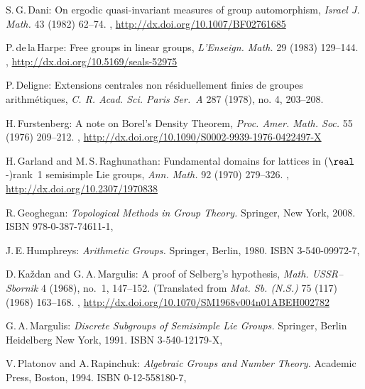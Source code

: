 \begin{references}{99}
 S.\,G.\,Dani: 
 On ergodic quasi-invariant measures of group
automorphism,
 \emph{Israel J. Math.} 43 (1982) 62--74.
 ,
 \url{http://dx.doi.org/10.1007/BF02761685}
 
 P.\,de\,la\,Harpe:
 Free groups in linear groups,
 \emph{L'Enseign. Math.} 29 (1983) 129--144.
,
\maynewline
\url{http://dx.doi.org/10.5169/seals-52975}

  P.\,Deligne:
   Extensions centrales non r\'esiduellement finies de groupes arithm\'etiques,
   \emph{C. R. Acad. Sci. Paris Ser.~A}  287  (1978), no. 4, 203--208.

 H.\,Furstenberg:
 A note on Borel's Density Theorem,
 \emph{Proc. Amer. Math. Soc.} 55 (1976) 209--212.
 ,
 \maynewline
 \url{http://dx.doi.org/10.1090/S0002-9939-1976-0422497-X}

 H.\,Garland and M.\,S.\,Raghunathan:
 Fundamental domains for lattices in ($\real$-)rank~1
semisimple Lie groups,
 \emph{Ann. Math.} 92 (1970) 279--326.
 ,
 \url{http://dx.doi.org/10.2307/1970838}

R.\,Geoghegan:
\emph{Topological Methods in Group Theory.}
Springer, New York, 2008.
ISBN 978-0-387-74611-1,
 
 J.\,E.\,Humphreys:
 \emph{Arithmetic Groups.}
 Springer, Berlin, 1980. 
 ISBN 3-540-09972-7,
 

D.\,Ka\v zdan and G.\,A.\,Margulis:
A proof of Selberg's hypothesis,
\emph{Math. USSR--Sbornik}  4 (1968), no.~1, 147--152.
(Translated from
\emph{Mat. Sb. (N.S.)} 75 (117) (1968) 163--168.
,
\url{http://dx.doi.org/10.1070/SM1968v004n01ABEH002782}

 G.\,A.\,Margulis:
 \emph{Discrete Subgroups of Semisimple Lie Groups.}
 Springer, {Berlin Heidelberg New York}, 1991.
 ISBN 3-540-12179-X,

 V.\,Platonov and A.\,Rapinchuk: 
 \emph{Algebraic Groups and Number Theory.}
 Academic Press, Boston, 1994.
 ISBN 0-12-558180-7,


\end{references}
